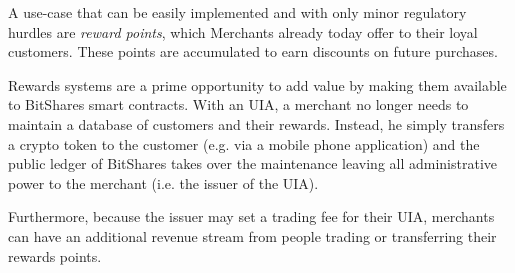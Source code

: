 A use-case that can be easily implemented and with only minor regulatory
hurdles are \emph{reward points}, which Merchants already today offer to their
loyal customers. These points are accumulated to earn discounts on future
purchases.

Rewards systems are a prime opportunity to add value by making them available
to BitShares smart contracts. With an UIA, a merchant no longer needs to
maintain a database of customers and their rewards. Instead, he simply
transfers a crypto token to the customer (e.g. via a mobile phone application)
and the public ledger of BitShares takes over the maintenance leaving all
administrative power to the merchant (i.e. the issuer of the UIA).

Furthermore, because the issuer may set a trading fee for their UIA, merchants
can have an additional revenue stream from people trading or transferring their
rewards points.
